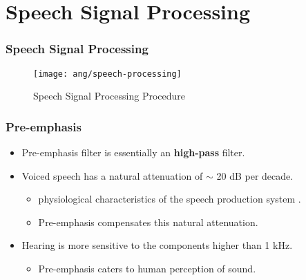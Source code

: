 \section{Speech Signal Processing}

\begin{frame}
\frametitle{Speech Signal Processing}

\begin{figure}[H]
\centering
\texttt{[image: ang/speech-processing]}
\caption{Speech Signal Processing Procedure}
\end{figure}
\end{frame}


\begin{frame}
\frametitle{Pre-emphasis}
\begin{itemize}
\item Pre-emphasis filter is essentially an \textbf{high-pass} filter.
\vspace{15pt}
\item Voiced speech has a natural attenuation of $\sim$ 20 dB per decade.
\begin{itemize}
\item physiological characteristics of the speech production system \cite{picone1993signal}.
\item Pre-emphasis compensates this natural attenuation.
\end{itemize}
\vspace{15pt}
\item Hearing is more sensitive to the components higher than 1 kHz.
\begin{itemize}
\item Pre-emphasis caters to human perception of sound.
\end{itemize}
\end{itemize}
\end{frame}


